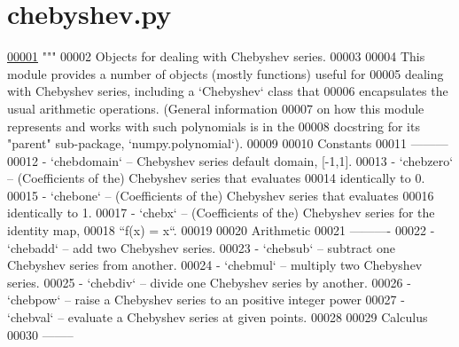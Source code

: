 \hypertarget{chebyshev_8py_source}{}\section{chebyshev.\+py}
\label{chebyshev_8py_source}

\begin{DoxyCode}
\hypertarget{chebyshev_8py_source_l00001}{}\hyperlink{namespacepyneb_1_1utils_1_1chebyshev}{00001} \textcolor{stringliteral}{"""}
00002 \textcolor{stringliteral}{Objects for dealing with Chebyshev series.}
00003 \textcolor{stringliteral}{}
00004 \textcolor{stringliteral}{This module provides a number of objects (mostly functions) useful for}
00005 \textcolor{stringliteral}{dealing with Chebyshev series, including a `Chebyshev` class that}
00006 \textcolor{stringliteral}{encapsulates the usual arithmetic operations.  (General information}
00007 \textcolor{stringliteral}{on how this module represents and works with such polynomials is in the}
00008 \textcolor{stringliteral}{docstring for its "parent" sub-package, `numpy.polynomial`).}
00009 \textcolor{stringliteral}{}
00010 \textcolor{stringliteral}{Constants}
00011 \textcolor{stringliteral}{---------}
00012 \textcolor{stringliteral}{- `chebdomain` -- Chebyshev series default domain, [-1,1].}
00013 \textcolor{stringliteral}{- `chebzero` -- (Coefficients of the) Chebyshev series that evaluates}
00014 \textcolor{stringliteral}{  identically to 0.}
00015 \textcolor{stringliteral}{- `chebone` -- (Coefficients of the) Chebyshev series that evaluates}
00016 \textcolor{stringliteral}{  identically to 1.}
00017 \textcolor{stringliteral}{- `chebx` -- (Coefficients of the) Chebyshev series for the identity map,}
00018 \textcolor{stringliteral}{  ``f(x) = x``.}
00019 \textcolor{stringliteral}{}
00020 \textcolor{stringliteral}{Arithmetic}
00021 \textcolor{stringliteral}{----------}
00022 \textcolor{stringliteral}{- `chebadd` -- add two Chebyshev series.}
00023 \textcolor{stringliteral}{- `chebsub` -- subtract one Chebyshev series from another.}
00024 \textcolor{stringliteral}{- `chebmul` -- multiply two Chebyshev series.}
00025 \textcolor{stringliteral}{- `chebdiv` -- divide one Chebyshev series by another.}
00026 \textcolor{stringliteral}{- `chebpow` -- raise a Chebyshev series to an positive integer power}
00027 \textcolor{stringliteral}{- `chebval` -- evaluate a Chebyshev series at given points.}
00028 \textcolor{stringliteral}{}
00029 \textcolor{stringliteral}{Calculus}
00030 \textcolor{stringliteral}{--------}

\end{DoxyCode}
